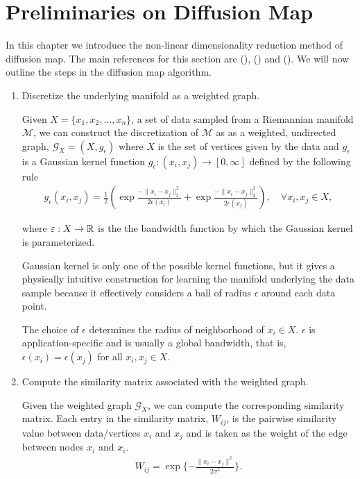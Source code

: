 \chapter{Preliminaries on Diffusion Map} 
\label{chapter-nonlinear} 

In this chapter we introduce the non-linear dimensionality reduction method of diffusion map. The main references for this section are (\cite{coifman_geometric_2005}),   (\cite{coifman_diffusion_2006}) and (\cite{stanley_geometric_2020}). We will now outline the steps in the diffusion map algorithm.
\begin{enumerate}
\item Discretize the underlying manifold as a weighted graph.
\begin{defn}

Given $X = \{x_1, x_2,\dots, x_n\}$, a set of data sampled from a Riemannian manifold $\mathcal{M}$, we can construct the discretization of $\mathcal{M}$ as as a weighted, undirected graph, $\mathcal{G}_X = (X, g_\epsilon)$ where $X$ is the set of vertices given by the data and $g_\epsilon$ is a Gaussian kernel function $g_\epsilon: (x_i, x_j) \to [0,\infty]$ defined by the following rule
\begin{align}
    g_\epsilon(x_i,x_j) = \frac{1}{2}\left(\exp{\frac{-\|x_i - x_j\|_2^2}{2\epsilon(x_i)}} + \exp{\frac{-\|x_i - x_j\|_2^2}{2\epsilon(x_j)}}\right), \quad \forall x_i,x_j \in X, 
\end{align}

 where $\varepsilon: X \to \mathbb R$ is the the bandwidth function by which the Gaussian kernel is parameterized. 
\end{defn}

Gaussian kernel is only one of the possible kernel functions, but it gives a physically intuitive construction for learning the manifold underlying the data sample because it effectively considers a ball of radius $\epsilon$ around each data point.

The choice of $\epsilon$ determines the radius of neighborhood of $x_i \in X$. $\epsilon$ is application-specific and is usually a global bandwidth, that is, $\epsilon(x_i) = \epsilon(x_j)$ for all $x_i, x_j \in X.$ 

\item Compute the similarity matrix associated with the weighted graph.

Given the weighted graph $\mathcal{G}_X$, we can compute the corresponding similarity matrix. Each entry in the similarity matrix, $W_{i j}$, is the pairwise similarity value between data/vertices $x_i$ and $x_j$ and is taken as the weight of the edge between nodes $x_i$ and $x_i$. 
    \begin{align}
        W_{i j } = \exp\{-\frac{\|x_i - x_j\|^2}{2\sigma^2}\}.
    \end{align}
    

\end{enumerate}

